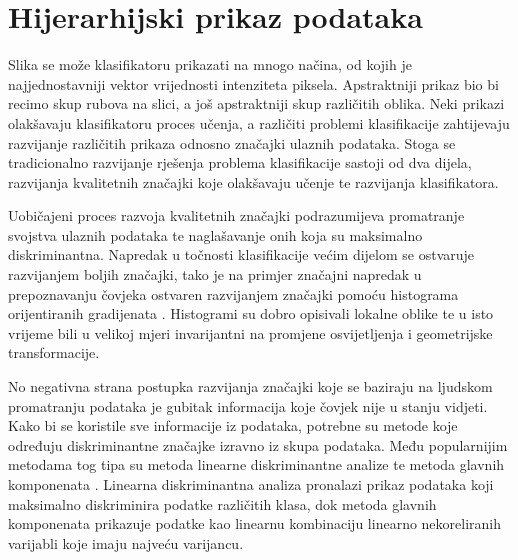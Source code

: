 \documentclass[lmodern, utf8, diplomski, numeric]{fer}
\begin{document}
\section{Hijerarhijski prikaz podataka}

Slika se može klasifikatoru prikazati na mnogo načina, od kojih je najjednostavniji vektor vrijednosti intenziteta piksela. Apstraktniji prikaz bio bi recimo skup rubova na slici, a još apstraktniji skup različitih oblika. Neki prikazi olakšavaju klasifikatoru proces učenja, a različiti problemi klasifikacije zahtijevaju razvijanje različitih prikaza odnosno značajki ulaznih podataka. Stoga  se tradicionalno razvijanje rješenja problema klasifikacije sastoji od dva dijela, razvijanja kvalitetnih značajki koje olakšavaju učenje te razvijanja klasifikatora. 

Uobičajeni proces razvoja kvalitetnih značajki podrazumijeva promatranje svojstva ulaznih podataka te naglašavanje onih koja su maksimalno diskriminantna. Napredak u točnosti klasifikacije većim dijelom se ostvaruje razvijanjem boljih značajki, tako je na primjer značajni napredak u prepoznavanju čovjeka ostvaren razvijanjem značajki pomoću histograma orijentiranih gradijenata  \cite{dalal2005hog}. Histogrami su dobro opisivali lokalne oblike te u isto vrijeme bili u velikoj mjeri invarijantni na  promjene osvijetljenja i geometrijske transformacije. 

No negativna strana postupka razvijanja značajki koje se baziraju na ljudskom promatranju podataka je gubitak informacija koje čovjek nije u stanju vidjeti. Kako bi se koristile sve informacije iz podataka, potrebne su metode koje određuju diskriminantne značajke izravno iz skupa podataka. Među popularnijim metodama tog tipa su metoda linearne diskriminantne analize  te metoda glavnih komponenata . Linearna diskriminantna analiza pronalazi prikaz podataka koji maksimalno diskriminira podatke različitih klasa, dok metoda glavnih komponenata prikazuje podatke kao linearnu kombinaciju linearno nekoreliranih varijabli koje imaju najveću varijancu.
\end{document}
